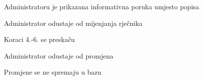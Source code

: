 \begin{packed_item}
\begin{packed_item}
\begin{packed_enum}
			\item Administratoru je prikazana informativna poruka umjesto popisa
			\item Administrator odustaje od mijenjanja rječnika
			\item Koraci 4.-6. se preskaču
			
		\end{packed_enum}

		\item[5.a] Administrator odustaje od promjena
		\item[] \begin{packed_enum}
			
			\item Promjene se ne spremaju u bazu
			
		\end{packed_enum}
		
	\end{packed_item}

\end{packed_item}


